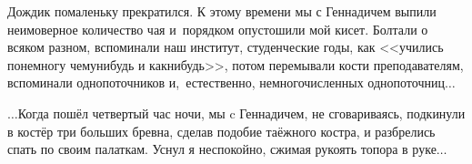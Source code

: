 Дождик помаленьку прекратился. К этому времени мы с Геннадичем выпили неимоверное количество чая и~порядком опустошили мой кисет. Болтали о всяком разном, вспоминали наш институт, студенческие годы, как <<учились понемногу чему\sdash нибудь и как\sdash нибудь>>, потом перемывали кости преподавателям, вспоминали однопоточников и,~естественно, немногочисленных однопоточниц$\ldots$





$\ldots$Когда пошёл четвертый час ночи, мы c Геннадичем, не сговариваясь, подкинули в костёр три больших бревна, сделав подобие таёжного костра, и разбрелись спать по своим палаткам. Уснул я неспокойно, сжимая рукоять топора в руке$\ldots$ 

\begin{center}
\end{center}
